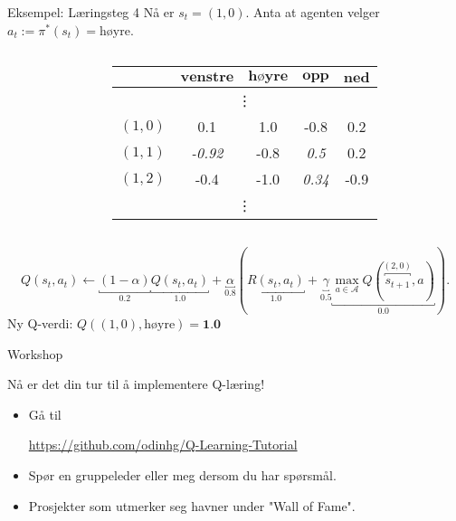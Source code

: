 \documentclass[UKenglish]{beamer}
\begin{document}
\begin{frame}{Eksempel: Læringsteg 4}
	Nå er $s_t=(1,0)$. Anta at agenten velger $a_t:=\pi^*(s_t)=\text{høyre}$.
	\vspace{-1em}
	\begin{columns}
		\begin{column}{0.4\textwidth}
			\begin{center}
				
			\end{center}
		\end{column}
		\begin{column}{0.6\textwidth}%
			\begin{table}[!hbt]
				\centering
				\def\arraystretch{1.0}
				\setlength{}
				\begin{tabular}{|c|c|c|c|c|}\hline
					\diagbox{$\textbf{s}$}{$\textbf{a}$} & $\textbf{venstre}$ & $\textbf{høyre}$ & $\textbf{opp}$ & $\textbf{ned}$\\ \hline
					\multicolumn{5}{|c|}{\vdots} \\ \hline
					\rowcolor{orange!35}$(1,0)$ & 0.1 & \cellcolor{orange!70}1.0 & -0.8 & 0.2 \\ \hline
					$(1,1)$ & \textit{-0.92} & -0.8 & \textit{0.5} & 0.2 \\ \hline
					$(1,2)$ & -0.4 & -1.0 & \textit{0.34} & -0.9 \\ \hline
					\multicolumn{5}{|c|}{\vdots}\\ \hline
				\end{tabular}
			\end{table}
		\end{column}
	\end{columns}		
	$$
	Q(s_t, a_t)\leftarrow\underbracket{(1-\alpha)}_{0.2}\underbracket{Q(s_t, a_t)}_{1.0}+\underbracket{\alpha}_{0.8}\left(\underbracket{R(s_t, a_t)}_{1.0}+\underbracket{\gamma}_{0.5}\underbracket{\max_{a\in\mathcal{A}} Q(\overbracket{s_{t+1}}^{(2,0)}, a)}_{0.0}\right).
	$$
	Ny Q-verdi: $Q((1,0), \text{høyre})=\textbf{1.0}$
\end{frame}

\begin{frame}{Workshop}

\vspace{1em}

Nå er det din tur til å implementere Q-læring!

\vspace{1em}

\begin{itemize}
	\setlength\itemsep{2em}
	\item Gå til 
	
	\vspace{0.5em}
	
	{\Large\url{https://github.com/odinhg/Q-Learning-Tutorial}}
	
	\item Spør en gruppeleder eller meg dersom du har spørsmål.
	\item Prosjekter som utmerker seg havner under "Wall of Fame".
\end{itemize}


\end{frame}
\end{document}
